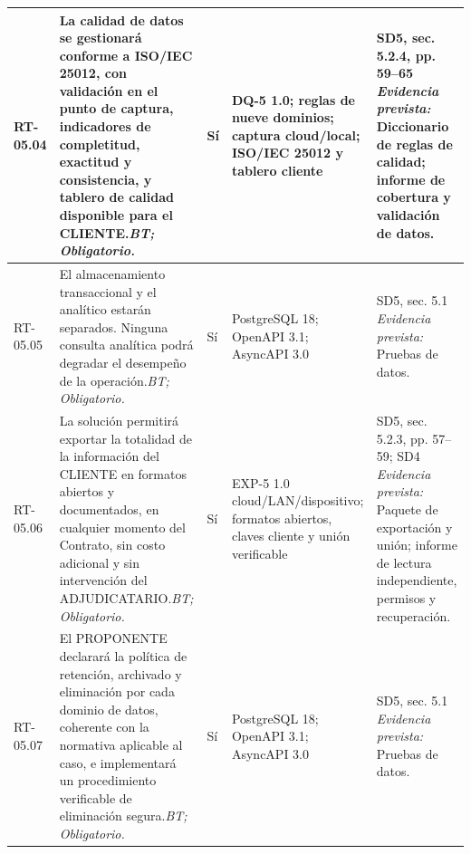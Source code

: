 \begin{paginaHorizontalSynaptix}
\begin{longtable}{|L{0.09\AnchoMatrizTDoce}|L{0.385\AnchoMatrizTDoce}|L{0.065\AnchoMatrizTDoce}|L{0.18\AnchoMatrizTDoce}|L{0.28\AnchoMatrizTDoce}|}
RT-\allowbreak{}05.\allowbreak{}04 &
La calidad de datos se gestionará conforme a ISO/IEC 25012, con validación en el punto de captura, indicadores de completitud, exactitud y consistencia, y tablero de calidad disponible para el CLIENTE.\newline\textit{BT; Obligatorio.} &
Sí &
DQ-5 1.0; reglas de nueve dominios; captura cloud/\allowbreak{}local; ISO/\allowbreak{}IEC 25012 y tablero cliente &
SD5, sec. 5.2.4, pp. 59--65 \newline\textit{Evidencia prevista:} Diccionario de reglas de calidad; informe de cobertura y validación de datos. \\ \hline

RT-\allowbreak{}05.\allowbreak{}05 &
El almacenamiento transaccional y el analítico estarán separados. Ninguna consulta analítica podrá degradar el desempeño de la operación.\newline\textit{BT; Obligatorio.} &
Sí &
PostgreSQL 18; OpenAPI 3.1; AsyncAPI 3.0 &
SD5, sec. 5.1 \newline\textit{Evidencia prevista:} Pruebas de datos. \\ \hline

RT-\allowbreak{}05.\allowbreak{}06 &
La solución permitirá exportar la totalidad de la información del CLIENTE en formatos abiertos y documentados, en cualquier momento del Contrato, sin costo adicional y sin intervención del ADJUDICATARIO.\newline\textit{BT; Obligatorio.} &
Sí &
EXP-5 1.0 cloud/\allowbreak{}LAN/\allowbreak{}dispositivo; formatos abiertos, claves cliente y unión verificable &
SD5, sec. 5.2.3, pp. 57--59; SD4 \newline\textit{Evidencia prevista:} Paquete de exportación y unión; informe de lectura independiente, permisos y recuperación. \\ \hline

RT-\allowbreak{}05.\allowbreak{}07 &
El PROPONENTE declarará la política de retención, archivado y eliminación por cada dominio de datos, coherente con la normativa aplicable al caso, e implementará un procedimiento verificable de eliminación segura.\newline\textit{BT; Obligatorio.} &
Sí &
PostgreSQL 18; OpenAPI 3.1; AsyncAPI 3.0 &
SD5, sec. 5.1 \newline\textit{Evidencia prevista:} Pruebas de datos. \\ \hline


\end{longtable}
\end{paginaHorizontalSynaptix}
